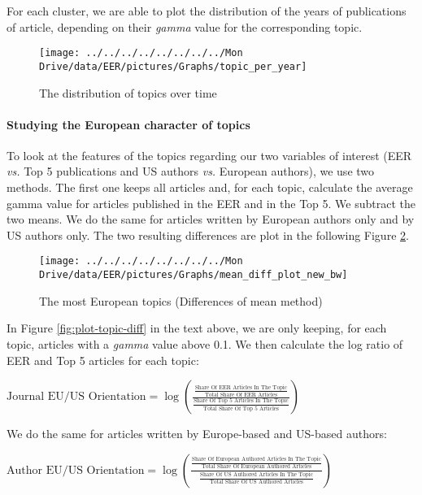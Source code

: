 \documentclass[
  12pt,
  onecolumn]{article}
\begin{document}
For each cluster, we are able to plot the distribution of the years of
publications of article, depending on their \emph{gamma} value for the
corresponding topic.

\begin{figure}[h]

{\centering \texttt{[image: ../../../../../../../../Mon Drive/data/EER/pictures/Graphs/topic\_per\_year]} 

}

\caption{The distribution of topics over time}\label{fig:plot-topic-year}
\end{figure}

\hypertarget{studying-the-european-character-of-topics}{%
\paragraph*{Studying the European character of
topics}\label{studying-the-european-character-of-topics}}

To look at the features of the topics regarding our two variables of
interest (EER \emph{vs.} Top 5 publications and US authors \emph{vs.}
European authors), we use two methods. The first one keeps all articles
and, for each topic, calculate the average gamma value for articles
published in the EER and in the Top 5. We subtract the two means. We do
the same for articles written by European authors only and by US authors
only. The two resulting differences are plot in the following Figure
\ref{fig:plot-topic-diff-alternative}.

\begin{figure}[h]

{\centering \texttt{[image: ../../../../../../../../Mon Drive/data/EER/pictures/Graphs/mean\_diff\_plot\_new\_bw]} 

}

\caption{The most European topics (Differences of mean method)}\label{fig:plot-topic-diff-alternative}
\end{figure}

In Figure \ref{fig:plot-topic-diff} in the text above, we are only
keeping, for each topic, articles with a \emph{gamma} value above 0.1.
We then calculate the log ratio of EER and Top 5 articles for each
topic:

\bigskip

\({\scriptstyle \text{Journal EU/US Orientation}=\log(\frac{\frac{\text{Share Of EER Articles In The Topic}}{\text{Total Share Of EER Articles}}} {\frac{\text{Share Of Top 5 Articles In The Topic}}{\text{Total Share Of Top 5 Articles}}})}\)

\bigskip

We do the same for articles written by Europe-based and US-based
authors:

\bigskip

\({\scriptstyle \text{Author EU/US Orientation}=\log(\frac{\frac{\text{Share Of European Authored Articles In The Topic}}{\text{Total Share Of European Authored Articles}}} {\frac{\text{Share Of US Authored Articles In The Topic}}{\text{Total Share Of US Authored Articles}}})}\)
\end{document}

